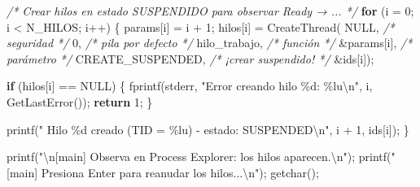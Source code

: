 \documentclass[
  spanish,
]{article}
\newenvironment{Shaded}{}{}
\newcommand{\CommentTok}[1]{\textcolor[rgb]{0.38,0.63,0.69}{\textit{#1}}}
\newcommand{\ControlFlowTok}[1]{\textcolor[rgb]{0.00,0.44,0.13}{\textbf{#1}}}
\newcommand{\DecValTok}[1]{\textcolor[rgb]{0.25,0.63,0.44}{#1}}
\newcommand{\NormalTok}[1]{#1}
\newcommand{\OperatorTok}[1]{\textcolor[rgb]{0.40,0.40,0.40}{#1}}
\newcommand{\SpecialCharTok}[1]{\textcolor[rgb]{0.25,0.44,0.63}{#1}}
\newcommand{\StringTok}[1]{\textcolor[rgb]{0.25,0.44,0.63}{#1}}
\begin{document}
\begin{Shaded}
\begin{Highlighting}[]
    \CommentTok{/* Crear hilos en estado SUSPENDIDO para observar Ready → ... */}
    \ControlFlowTok{for} \OperatorTok{(}\NormalTok{i }\OperatorTok{=} \DecValTok{0}\OperatorTok{;}\NormalTok{ i }\OperatorTok{\textless{}}\NormalTok{ N\_HILOS}\OperatorTok{;}\NormalTok{ i}\OperatorTok{++)} \OperatorTok{\{}
\NormalTok{        params}\OperatorTok{[}\NormalTok{i}\OperatorTok{]} \OperatorTok{=}\NormalTok{ i }\OperatorTok{+} \DecValTok{1}\OperatorTok{;}
\NormalTok{        hilos}\OperatorTok{[}\NormalTok{i}\OperatorTok{]} \OperatorTok{=}\NormalTok{ CreateThread}\OperatorTok{(}
\NormalTok{            NULL}\OperatorTok{,}            \CommentTok{/* seguridad */}
            \DecValTok{0}\OperatorTok{,}               \CommentTok{/* pila por defecto */}
\NormalTok{            hilo\_trabajo}\OperatorTok{,}    \CommentTok{/* función */}
            \OperatorTok{\&}\NormalTok{params}\OperatorTok{[}\NormalTok{i}\OperatorTok{],}      \CommentTok{/* parámetro */}
\NormalTok{            CREATE\_SUSPENDED}\OperatorTok{,} \CommentTok{/* ¡crear suspendido! */}
            \OperatorTok{\&}\NormalTok{ids}\OperatorTok{[}\NormalTok{i}\OperatorTok{]);}

        \ControlFlowTok{if} \OperatorTok{(}\NormalTok{hilos}\OperatorTok{[}\NormalTok{i}\OperatorTok{]} \OperatorTok{==}\NormalTok{ NULL}\OperatorTok{)} \OperatorTok{\{}
\NormalTok{            fprintf}\OperatorTok{(}\NormalTok{stderr}\OperatorTok{,} \StringTok{"Error creando hilo }\SpecialCharTok{\%d}\StringTok{: }\SpecialCharTok{\%lu\textbackslash{}n}\StringTok{"}\OperatorTok{,}\NormalTok{ i}\OperatorTok{,}\NormalTok{ GetLastError}\OperatorTok{());}
            \ControlFlowTok{return} \DecValTok{1}\OperatorTok{;}
        \OperatorTok{\}}

\NormalTok{        printf}\OperatorTok{(}\StringTok{"  Hilo }\SpecialCharTok{\%d}\StringTok{ creado (TID = }\SpecialCharTok{\%lu}\StringTok{) {-} estado: SUSPENDED}\SpecialCharTok{\textbackslash{}n}\StringTok{"}\OperatorTok{,}
\NormalTok{               i }\OperatorTok{+} \DecValTok{1}\OperatorTok{,}\NormalTok{ ids}\OperatorTok{[}\NormalTok{i}\OperatorTok{]);}
    \OperatorTok{\}}

\NormalTok{    printf}\OperatorTok{(}\StringTok{"}\SpecialCharTok{\textbackslash{}n}\StringTok{[main] Observa en Process Explorer: los hilos aparecen.}\SpecialCharTok{\textbackslash{}n}\StringTok{"}\OperatorTok{);}
\NormalTok{    printf}\OperatorTok{(}\StringTok{"[main] Presiona Enter para reanudar los hilos...}\SpecialCharTok{\textbackslash{}n}\StringTok{"}\OperatorTok{);}
\NormalTok{    getchar}\OperatorTok{();}


\end{Highlighting}
\end{Shaded}
\end{document}
